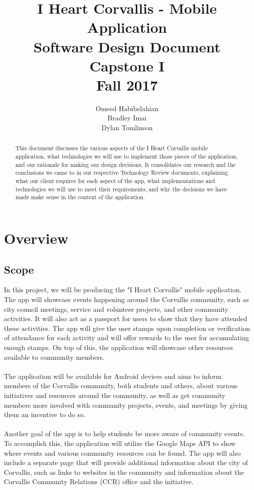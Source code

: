 \documentclass[draftclsnofoot, onecolumn, 10pt, compsoc]{IEEEtran}
\title{\textbf{I Heart Corvallis - Mobile Application\\Software Design Document}\\Capstone I\\Fall 2017}
\author{Omeed Habibelahian\\Bradley Imai\\Dylan Tomlinson}
\begin{document}
	\maketitle
	\begin{abstract}
		This document discusses the various aspects of the I Heart Corvallis mobile application, what technologies we will use to implement those pieces of the application, and our rationale for making our design decisions. It consolidates our research and the conclusions we came to in our respective Technology Review documents, explaining what our client requires for each aspect of the app, what implementations and technologies we will use to meet their requirements, and why the decisions we have made make sense in the context of the application.
	\end{abstract}
	\newpage
	
	\tableofcontents
	\newpage
	
	\section{Overview}
		\subsection{Scope}
			In this project, we will be producing the "I Heart Corvallis" mobile application. The app will showcase events happening around the Corvallis community, such as city council meetings, service and volunteer projects, and other community activities. It will also act as a passport for users to show that they have attended these activities. The app will give the user stamps upon completion or verification of attendance for each activity and will offer rewards to the user for accumulating enough stamps. On top of this, the application will showcase other resources available to community members. \\ \\
			The application will be available for Android devices and aims to inform members of the Corvallis community, both students and others, about various initiatives and resources around the community, as well as get community members more involved with community projects, events, and meetings by giving them an incentive to do so. \\ \\
			Another goal of the app is to help students be more aware of community events. To accomplish this, the application will utilize the Google Maps API to show where events and various community resources can be found. The app will also include a separate page that will provide additional information about the city of Corvallis, such as links to websites in the community and information about the Corvallis Community Relations (CCR) office and the initiative.
\end{document}
